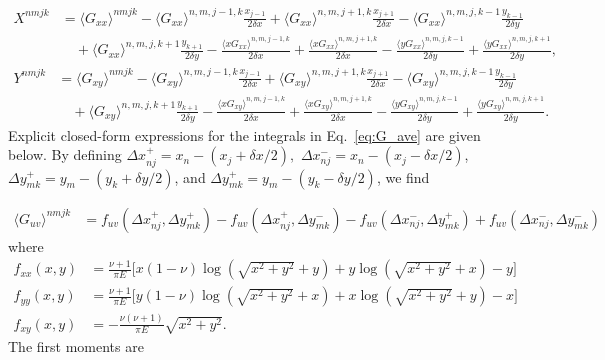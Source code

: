 \documentclass[aps,prl,reprint,twocolumn,groupedaddress,showpacs]{revtex4-1}
\begin{document}
\begin{widetext}
\begin{align}
X^{nmjk} & = \langle G_{xx} \rangle^{nmjk} - 
\langle G_{xx}\rangle^{n,m,j-1,k}\frac{x_{j-1}}{2\delta x}
+ \langle G_{xx} \rangle^{n,m,j+1,k}\frac{x_{j+1}}{2\delta x} 
-  \langle G_{xx} \rangle^{n,m,j,k-1}\frac{y_{k-1}}{2\delta y}  \nonumber\\
\: &\quad + \langle G_{xx} \rangle^{n,m,j,k+1}\frac{y_{k+1}}{2\delta y} 
-\frac{\langle xG_{xx} \rangle^{n,m,j-1,k}}{2\delta x}
+\frac{\langle xG_{xx} \rangle^{n,m,j+1,k}}{2\delta x} 
- \frac{\langle yG_{xx} \rangle^{n,m,j,k-1}}{2\delta y} 
+\frac{\langle yG_{xx} \rangle^{n,m,j,k+1}}{2\delta y}, 
\label{eq:linearsystemX}
\end{align}
\begin{align}
Y^{nmjk} & =  \langle G_{xy} \rangle^{nmjk} 
- \langle G_{xy} \rangle^{n,m,j-1,k}\frac{x_{j-1}}{2\delta x}
+\langle G_{xy} \rangle^{n,m,j+1,k}\frac{x_{j+1}}{2\delta x} 
- \langle G_{xy} \rangle^{n,m,j,k-1}\frac{y_{k-1}}{2\delta y} \nonumber\\
\: & \quad+\langle G_{xy} \rangle^{n,m,j,k+1}\frac{y_{k+1}}{2\delta y}  
-\frac{\langle xG_{xy} \rangle^{n,m,j-1,k}}{2\delta x}+
\frac{\langle xG_{xy} \rangle^{n,m,j+1,k}}{2\delta x} 
- \frac{\langle yG_{xy} \rangle^{n,m,j,k-1}}{2\delta y} 
+\frac{\langle yG_{xy} \rangle^{n,m,j,k+1}}{2\delta y}.
\label{eq:linearsystemY}
\end{align}
%
Explicit closed-form expressions for the integrals in
Eq.~\ref{eq:G_ave} are given below. By defining $\Delta x_{nj}^+ = x_n -
(x_j+\delta x/2),$ $\Delta x_{nj}^- = x_n - (x_j-\delta x/2)$, $\Delta
y_{mk}^+ = y_m - (y_k+\delta y/2)$, and $\Delta y_{mk}^+ = y_m -
(y_k-\delta y/2)$, we find

\begin{align}
\langle G_{uv}\rangle^{nmjk} &=   f_{uv}( \Delta x_{nj}^+,\Delta y_{mk}^+) - f_{uv}( \Delta x_{nj}^+,\Delta y_{mk}^-)
-f_{uv}(\Delta x_{nj}^-, \Delta y_{mk}^+) + f_{uv}(\Delta x_{nj}^- , \Delta y_{mk}^-)
\end{align}
where
\begin{align}
f_{xx}(x,y) &= \frac{\nu+1}{\pi E}\Bigg[ x(1-\nu ) \log\left( \sqrt{x^2+y^2}+y\right)
+ y \log\left(\sqrt{x^2+y^2} +x\right)-y  \Bigg] \label{eq:fxx} \\
f_{yy}(x,y) &= \frac{\nu+1}{\pi E}\Bigg[ y(1-\nu ) \log\left( \sqrt{x^2+y^2}+x\right)
+ x \log\left(\sqrt{x^2+y^2} +y\right)-x  \Bigg] \label{eq:fyy} \\
f_{xy}(x,y) &= -\frac{\nu(\nu+1)}{\pi E}\sqrt{x^2+y^2}. \label{eq:fxy}
\end{align}
%
The first moments are


\end{widetext}
\end{document}
